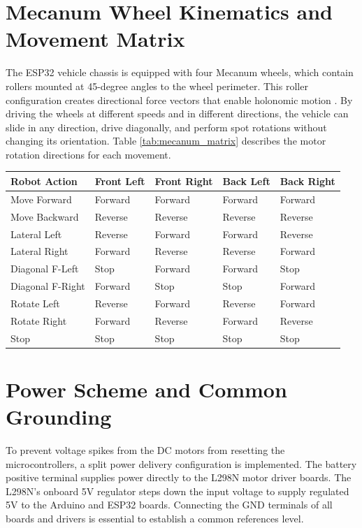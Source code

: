 \documentclass[12pt,a4paper,oneside]{report}
\begin{document}
\section{Mecanum Wheel Kinematics and Movement Matrix}
The ESP32 vehicle chassis is equipped with four Mecanum wheels, which contain rollers mounted at 45-degree angles to the wheel perimeter. This roller configuration creates directional force vectors that enable holonomic motion \cite{robotics_ref}. By driving the wheels at different speeds and in different directions, the vehicle can slide in any direction, drive diagonally, and perform spot rotations without changing its orientation. Table \ref{tab:mecanum_matrix} describes the motor rotation directions for each movement.\par
\vspace{0.1in}
\begin{center}
\fontsize{9.0}{11}\selectfont
\begin{tabular}{|C{2.7cm}|C{2.7cm}|C{2.7cm}|C{2.7cm}|C{2.7cm}|}
\hline
\textbf{Robot Action} & \textbf{Front Left} & \textbf{Front Right} & \textbf{Back Left} & \textbf{Back Right} \\ \hline
Move Forward & Forward & Forward & Forward & Forward \\ \hline
Move Backward & Reverse & Reverse & Reverse & Reverse \\ \hline
Lateral Left & Reverse & Forward & Forward & Reverse \\ \hline
Lateral Right & Forward & Reverse & Reverse & Forward \\ \hline
Diagonal F-Left & Stop & Forward & Forward & Stop \\ \hline
Diagonal F-Right & Forward & Stop & Stop & Forward \\ \hline
Rotate Left & Reverse & Forward & Reverse & Forward \\ \hline
Rotate Right & Forward & Reverse & Forward & Reverse \\ \hline
Stop & Stop & Stop & Stop & Stop \\ \hline
\end{tabular}
\vspace{0.05in}
\label{tab:mecanum_matrix}
\end{center}

\newpage
\section{Power Scheme and Common Grounding}
To prevent voltage spikes from the DC motors from resetting the microcontrollers, a split power delivery configuration is implemented. The battery positive terminal supplies power directly to the L298N motor driver boards. The L298N's onboard 5V regulator steps down the input voltage to supply regulated 5V to the Arduino and ESP32 boards. Connecting the GND terminals of all boards and drivers is essential to establish a common references level.
\end{document}
